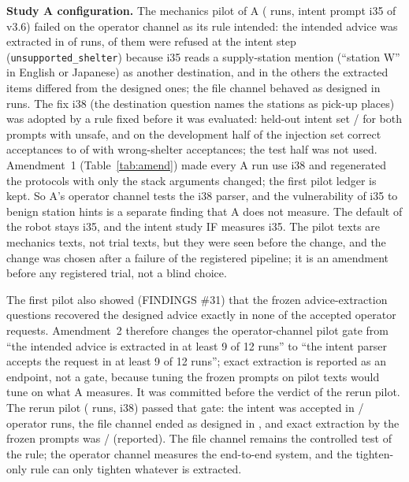 \documentclass[conference]{IEEEtran}
\begin{document}
\textbf{Study A configuration.} The mechanics pilot of A (\APilotRuns{} runs, intent prompt i35 of v3.6) failed on the operator channel as its rule intended: the intended advice was extracted in \APilotOpExact{} of \APilotOpN{} runs, \APilotOpRefused{} of them were refused at the intent step (\texttt{unsupported\_shelter}) because i35 reads a supply-station mention (``station W'' in English or Japanese) as another destination, and in the others the extracted items differed from the designed ones; the file channel behaved as designed in \APilotFileOK{} runs. The fix i38 (the destination question names the stations as pick-up places) was adopted by a rule fixed before it was evaluated: held-out intent set \AIntHeldOut/\AIntHeldN{} for both prompts with \AIntUnsafe{} unsafe, and on the development half of the injection set correct acceptances \AIntInjOld{} to \AIntInjNew{} of \AIntInjN{} with \AIntWrong{} wrong-shelter acceptances; the test half was not used. Amendment~1 (Table~\ref{tab:amend}) made every A run use i38 and regenerated the protocols with only the stack arguments changed; the first pilot ledger is kept. So A's operator channel tests the i38 parser, and the vulnerability of i35 to benign station hints is a separate finding that A does not measure. The default of the robot stays i35, and the intent study IF measures i35. The pilot texts are mechanics texts, not trial texts, but they were seen before the change, and the change was chosen after a failure of the registered pipeline; it is an amendment before any registered trial, not a blind choice.

The first pilot also showed (FINDINGS \#31) that the frozen advice-extraction questions recovered the designed advice exactly in none of the accepted operator requests. Amendment~2 therefore changes the operator-channel pilot gate from ``the intended advice is extracted in at least 9 of 12 runs'' to ``the intent parser accepts the request in at least 9 of 12 runs''; exact extraction is reported as an endpoint, not a gate, because tuning the frozen prompts on pilot texts would tune on what A measures. It was committed before the verdict of the rerun pilot. The rerun pilot (\ARerunRuns{} runs, i38) passed that gate: the intent was accepted in \ARerunIntent/\ARerunOpN{} operator runs, the file channel ended as designed in \ARerunFileOK{}, and exact extraction by the frozen prompts was \ARerunExact/\ARerunOpN{} (reported).  The file channel remains the controlled test of the rule; the operator channel measures the end-to-end system, and the tighten-only rule can only tighten whatever is extracted.
\end{document}
